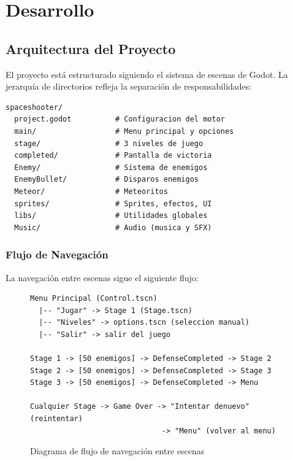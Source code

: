 \documentclass[12pt, a4paper, oneside]{report}
\begin{document}
\newpage

\chapter{Desarrollo}

\section{Arquitectura del Proyecto}

El proyecto está estructurado siguiendo el sistema de escenas de Godot. La jerarquía de directorios refleja la separación de responsabilidades:

\begin{lstlisting}[style=gdscript, caption=Estructura de directorios del proyecto]
spaceshooter/
  project.godot          # Configuracion del motor
  main/                  # Menu principal y opciones
  stage/                 # 3 niveles de juego
  completed/             # Pantalla de victoria
  Enemy/                 # Sistema de enemigos
  EnemyBullet/           # Disparos enemigos
  Meteor/                # Meteoritos
  sprites/               # Sprites, efectos, UI
  libs/                  # Utilidades globales
  Music/                 # Audio (musica y SFX)
\end{lstlisting}

\subsection{Flujo de Navegación}

La navegación entre escenas sigue el siguiente flujo:

\begin{figure}[H]
    \centering
    \begin{minipage}{0.9\textwidth}
    \small
    \begin{verbatim}
Menu Principal (Control.tscn)
  |-- "Jugar" -> Stage 1 (Stage.tscn)
  |-- "Niveles" -> options.tscn (seleccion manual)
  |-- "Salir" -> salir del juego

Stage 1 -> [50 enemigos] -> DefenseCompleted -> Stage 2
Stage 2 -> [50 enemigos] -> DefenseCompleted -> Stage 3
Stage 3 -> [50 enemigos] -> DefenseCompleted -> Menu

Cualquier Stage -> Game Over -> "Intentar denuevo" (reintentar)
                              -> "Menu" (volver al menu)
    \end{verbatim}
    \end{minipage}
    \caption{Diagrama de flujo de navegación entre escenas}
    \label{fig:flujo}
\end{figure}
\end{document}
